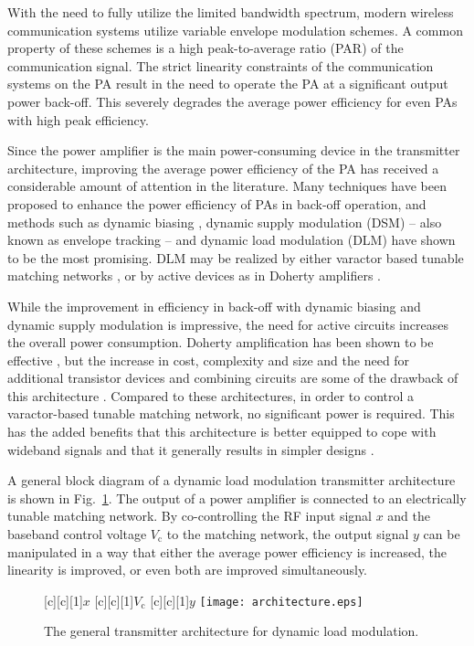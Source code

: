 \documentclass[10pt,journal]{IEEEtran}
\begin{document}
With the need to fully utilize the limited bandwidth spectrum, modern wireless communication systems utilize variable envelope modulation schemes. A common property of these schemes is a high peak-to-average ratio (PAR) of the communication signal. The strict linearity constraints of the communication systems on the PA result in the need to operate the PA at a significant output power back-off. This severely degrades the average power efficiency for even PAs with high peak efficiency.

Since the power amplifier is the main power-consuming device in the transmitter architecture, improving the average power efficiency of the PA has received a considerable amount of attention in the literature. Many techniques have been proposed to enhance the power efficiency of PAs in back-off operation, and methods such as dynamic biasing \cite{yang}, dynamic supply modulation (DSM) \cite{wang} -- also known as envelope tracking -- and dynamic load modulation (DLM) \cite{raab} have shown to be the most promising. DLM may be realized by either varactor based tunable matching networks \cite{fuMTT,hosseinMTT}, or by active devices as in Doherty amplifiers \cite{doherty,cripps}.

While the improvement in efficiency in back-off with dynamic biasing and dynamic supply modulation is impressive, the need for active circuits increases the overall power consumption. Doherty amplification has been shown to be effective \cite{pelk}, but the increase in cost, complexity and size and the need for additional transistor devices and combining circuits are some of the drawback of this architecture \cite{fuMTT}. Compared to these architectures, in order to control a varactor-based tunable matching network, no significant power is required. This has the added benefits that this architecture is better equipped to cope with wideband signals and that it generally results in simpler designs \cite{raab}.

A general block diagram of a dynamic load modulation transmitter architecture is shown in Fig.~\ref{architecture}. The output of a power amplifier is connected to an electrically tunable matching network. By co-controlling the RF input signal $x$ and the baseband control voltage $V_\text{c}$ to the matching network, the output signal $y$ can be manipulated in a way that either the average power efficiency is increased, the linearity is improved, or even both are improved simultaneously.

\begin{figure}[t]
\centering {}[c][c][1]{$x$} [c][c][1]{$V_\text{c}$}
[c][c][1]{$y$}
\texttt{[image: architecture.eps]}
\caption{The general transmitter architecture for dynamic load modulation.}
\label{architecture}
\end{figure}
\end{document}
